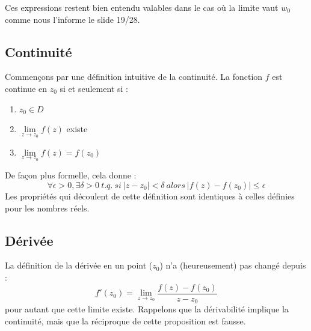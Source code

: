         Ces expressions restent bien entendu valables dans le cas où la limite vaut $w_0$ comme nous
        l'informe le slide 19/28.
        
        
    \subsection{Continuité}
    Commençons par une définition intuitive de la continuité. La fonction $f$ est continue
    en $z_0$ si et seulement si :
        \begin{enumerate}
        \item $z_0 \in D$
        \item $\lim\limits_{z\rightarrow z_0} f(z)$ existe
        \item $\lim\limits_{z\rightarrow z_0} f(z) = f(z_0)$
        \end{enumerate}
    De façon plus formelle, cela donne :
    \begin{equation}
    \forall \epsilon > 0, \exists \delta > 0\ t.q.\ si\ |z-z_0| < \delta\ alors\ |f(z) - f(z_0)|\leq \epsilon
    \end{equation}
    Les propriétés qui découlent de cette définition sont identiques à celles définies pour les
    nombres réels.
    
    
    \subsection{Dérivée}
    La définition de la dérivée en un point ($z_0$) n'a (heureusement) pas changé depuis :
    \begin{equation}
    f'(z_0) = \lim\limits_{z\rightarrow z_0} \frac{f(z)-f(z_0)}{z-z_0}
    \end{equation}
    pour autant que cette limite existe. Rappelons que la dérivabilité implique la continuité,
    mais que la réciproque de cette proposition est fausse.\\
    
    
